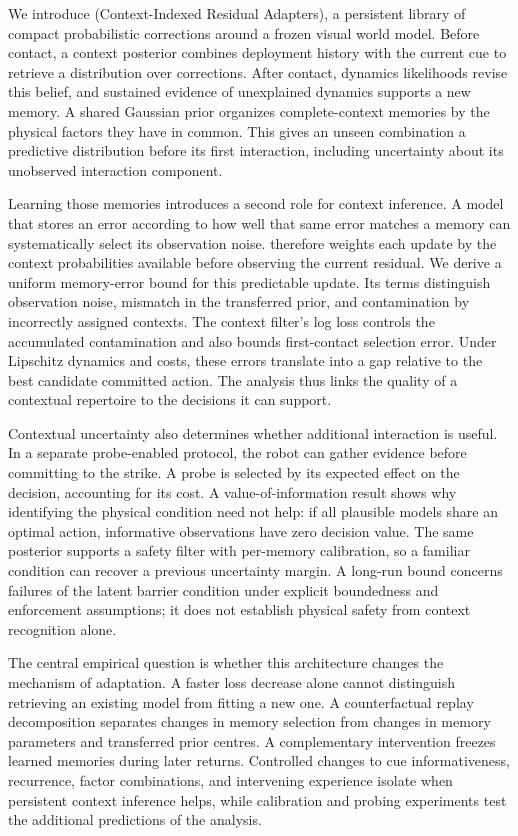 We introduce \method{} (Context-Indexed Residual Adapters), a persistent library of compact probabilistic corrections around a frozen visual world model. Before contact, a context posterior combines deployment history with the current cue to retrieve a distribution over corrections. After contact, dynamics likelihoods revise this belief, and sustained evidence of unexplained dynamics supports a new memory. A shared Gaussian prior organizes complete-context memories by the physical factors they have in common. This gives an unseen combination a predictive distribution before its first interaction, including uncertainty about its unobserved interaction component.

Learning those memories introduces a second role for context inference. A model that stores an error according to how well that same error matches a memory can systematically select its observation noise. \method{} therefore weights each update by the context probabilities available before observing the current residual. We derive a uniform memory-error bound for this predictable update. Its terms distinguish observation noise, mismatch in the transferred prior, and contamination by incorrectly assigned contexts. The context filter's log loss controls the accumulated contamination and also bounds first-contact selection error. Under Lipschitz dynamics and costs, these errors translate into a gap relative to the best candidate committed action. The analysis thus links the quality of a contextual repertoire to the decisions it can support.

Contextual uncertainty also determines whether additional interaction is useful. In a separate probe-enabled protocol, the robot can gather evidence before committing to the strike. A probe is selected by its expected effect on the decision, accounting for its cost. A value-of-information result shows why identifying the physical condition need not help: if all plausible models share an optimal action, informative observations have zero decision value. The same posterior supports a safety filter with per-memory calibration, so a familiar condition can recover a previous uncertainty margin. A long-run bound concerns failures of the latent barrier condition under explicit boundedness and enforcement assumptions; it does not establish physical safety from context recognition alone.

The central empirical question is whether this architecture changes the mechanism of adaptation. A faster loss decrease alone cannot distinguish retrieving an existing model from fitting a new one. A counterfactual replay decomposition separates changes in memory selection from changes in memory parameters and transferred prior centres. A complementary intervention freezes learned memories during later returns. Controlled changes to cue informativeness, recurrence, factor combinations, and intervening experience isolate when persistent context inference helps, while calibration and probing experiments test the additional predictions of the analysis.

